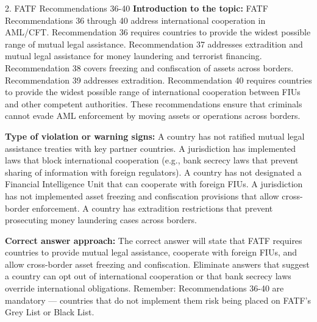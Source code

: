 \documentclass[11pt,a4paper]{beamer}
\begin{document}
\begin{frame}{2. FATF Recommendations 36-40}
\tiny
\noindent\textbf{Introduction to the topic:} FATF Recommendations 36 through 40 address international cooperation in AML/CFT. Recommendation 36 requires countries to provide the widest possible range of mutual legal assistance. Recommendation 37 addresses extradition and mutual legal assistance for money laundering and terrorist financing. Recommendation 38 covers freezing and confiscation of assets across borders. Recommendation 39 addresses extradition. Recommendation 40 requires countries to provide the widest possible range of international cooperation between FIUs and other competent authorities. These recommendations ensure that criminals cannot evade AML enforcement by moving assets or operations across borders.

\vspace{0.1cm}
\noindent\textbf{Type of violation or warning signs:} A country has not ratified mutual legal assistance treaties with key partner countries. A jurisdiction has implemented laws that block international cooperation (e.g., bank secrecy laws that prevent sharing of information with foreign regulators). A country has not designated a Financial Intelligence Unit that can cooperate with foreign FIUs. A jurisdiction has not implemented asset freezing and confiscation provisions that allow cross-border enforcement. A country has extradition restrictions that prevent prosecuting money laundering cases across borders.

\vspace{0.1cm}
\noindent\textbf{Correct answer approach:} The correct answer will state that FATF requires countries to provide mutual legal assistance, cooperate with foreign FIUs, and allow cross-border asset freezing and confiscation. Eliminate answers that suggest a country can opt out of international cooperation or that bank secrecy laws override international obligations. Remember: Recommendations 36-40 are mandatory — countries that do not implement them risk being placed on FATF's Grey List or Black List.
\end{frame}
\end{document}
